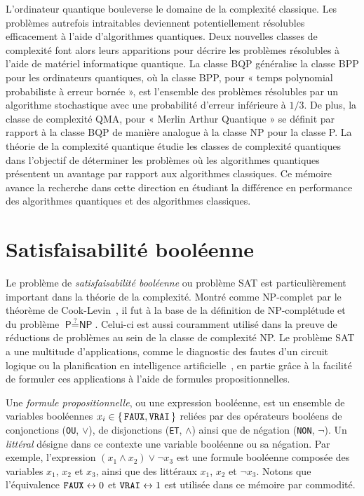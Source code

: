 L'ordinateur quantique bouleverse le domaine de la complexité classique. Les problèmes autrefois intraitables deviennent potentiellement résolubles efficacement à l'aide d'algorithmes quantiques. Deux nouvelles classes de complexité font alors leurs apparitions pour décrire les problèmes résolubles à l'aide de matériel informatique quantique. La classe \textsf{BQP} généralise la classe \textsf{BPP} pour les ordinateurs quantiques, où la classe \textsf{BPP}, pour « temps polynomial probabiliste à erreur bornée », est l'ensemble des problèmes résolubles par un algorithme stochastique avec une probabilité d'erreur inférieure à $1/3$. De plus, la classe de complexité \textsf{QMA}, pour « Merlin Arthur Quantique » se définit par rapport à la classe \textsf{BQP} de manière analogue à la classe \textsf{NP} pour la classe \textsf{P}. La théorie de la complexité quantique étudie les classes de complexité quantiques dans l'objectif de déterminer les problèmes où les algorithmes quantiques présentent un avantage par rapport aux algorithmes classiques. Ce mémoire avance la recherche dans cette direction en étudiant la différence en performance des algorithmes quantiques et des algorithmes classiques.


\section{Satisfaisabilité booléenne}
\label{sec:satisfaisabilite-booleenne}

Le problème de \textit{satisfaisabilité booléenne} ou problème SAT est particulièrement important dans la théorie de la complexité. Montré comme \textsf{NP}-complet par le théorème de Cook-Levin~\cite{cookComplexityTheoremprovingProcedures1971,levinUniversalSequentialSearch1973}, il fut à la base de la définition de \textsf{NP}-complétude et du problème $\textsf{P} \stackrel{?}{=} \textsf{NP}$. Celui-ci est aussi couramment utilisé dans la preuve de réductions de problèmes au sein de la classe de complexité \textsf
{NP}. Le problème SAT a une multitude d'applications, comme le diagnostic des fautes d'un circuit logique ou la planification en intelligence artificielle~\cite{marques-silvaPracticalApplicationsBoolean2008}, en partie grâce à la facilité de formuler ces applications à l'aide de formules propositionnelles.

Une \textit{formule propositionnelle}, ou une expression booléenne, est un ensemble de variables booléennes $x_{i} \in \set{\textsc{\texttt{FAUX}}, \textsc{\texttt{VRAI}}}$ reliées par des opérateurs booléens de conjonctions (\textsc{\texttt{OU}}, $\lor$), de disjonctions (\textsc{\texttt{ET}}, $\land$) ainsi que de négation (\textsc{\texttt{NON}}, $\neg$).  Un \textit{littéral} désigne dans ce contexte une variable booléenne ou sa négation. Par exemple, l'expression $(x_{1} \land x_{2}) \lor \neg x_{3}$ est une formule booléenne composée des variables $x_{1}$, $x_{2}$ et $x_{3}$, ainsi que des littéraux $x_{1}$, $x_{2}$ et $\neg x_{3}$. Notons que l'équivalence $\textsc{\texttt{FAUX}} \leftrightarrow 0$ et $\textsc{\texttt{VRAI}} \leftrightarrow 1$ est utilisée dans ce mémoire par commodité.

